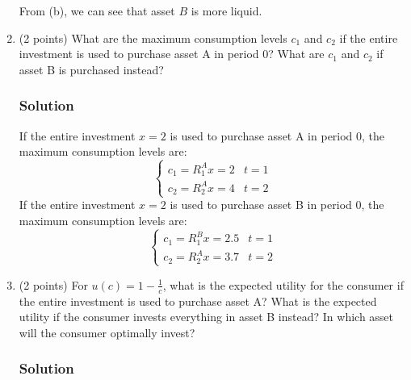 \documentclass[12pt]{article}
\begin{document}
\begin{enumerate}[label=(\alph*)]
    From (b), we can see that asset $B$ is more liquid. 

    \item (2 points) What are the maximum consumption levels $c_1$ and $c_2$ if the entire investment is used to purchase asset A in period 0? What are $c_1$ and $c_2$ if asset B is purchased instead?
    \subsubsection*{Solution}

    If the entire investment $x=2$ is used to purchase asset A in period 0, the  maximum consumption levels are:
    \begin{equation}\label{2d_1}
        \begin{cases}
        c_1 = R_{1}^Ax = 2 & t=1
        \\ c_2 = R_{2}^Ax = 4 & t=2
    \end{cases}
    \end{equation}
    If the entire investment $x=2$ is used to purchase asset B in period 0, the  maximum consumption levels are:
    \begin{equation}\label{2d_2}
        \begin{cases}
        c_1 = R_{1}^Bx = 2.5 & t=1
        \\ c_2 = R_{2}^Ax = 3.7 & t=2
    \end{cases}
    \end{equation}


    \item (2 points) For $u(c) = 1 - \frac{1}{c}$, what is the expected utility for the consumer if the entire investment is used to purchase asset A? 
    What is the expected utility if the consumer invests everything in asset B instead? In which asset will the consumer optimally invest?
    \subsubsection*{Solution}


\end{enumerate}
\end{document}
